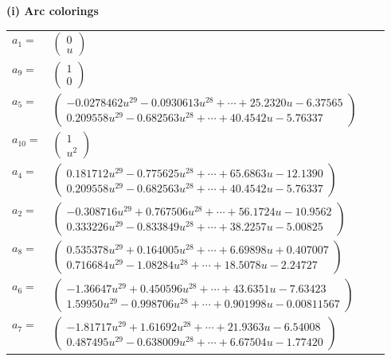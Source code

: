 \documentclass[1p]{elsarticle_modified}
\theoremstyle{definition}
\begin{document}
\flushleft \textbf{(i) Arc colorings}\\
\begin{tabular}{m{7pt} m{180pt} m{7pt} m{180pt} }
\flushright $a_{1}=$&$\begin{pmatrix}0\\u\end{pmatrix}$ \\
\flushright $a_{9}=$&$\begin{pmatrix}1\\0\end{pmatrix}$ \\
\flushright $a_{5}=$&$\begin{pmatrix}-0.0278462 u^{29}-0.0930613 u^{28}+\cdots+25.2320 u-6.37565\\0.209558 u^{29}-0.682563 u^{28}+\cdots+40.4542 u-5.76337\end{pmatrix}$ \\
\flushright $a_{10}=$&$\begin{pmatrix}1\\u^2\end{pmatrix}$ \\
\flushright $a_{4}=$&$\begin{pmatrix}0.181712 u^{29}-0.775625 u^{28}+\cdots+65.6863 u-12.1390\\0.209558 u^{29}-0.682563 u^{28}+\cdots+40.4542 u-5.76337\end{pmatrix}$ \\
\flushright $a_{2}=$&$\begin{pmatrix}-0.308716 u^{29}+0.767506 u^{28}+\cdots+56.1724 u-10.9562\\0.333226 u^{29}-0.833849 u^{28}+\cdots+38.2257 u-5.00825\end{pmatrix}$ \\
\flushright $a_{8}=$&$\begin{pmatrix}0.535378 u^{29}+0.164005 u^{28}+\cdots+6.69898 u+0.407007\\0.716684 u^{29}-1.08284 u^{28}+\cdots+18.5078 u-2.24727\end{pmatrix}$ \\
\flushright $a_{6}=$&$\begin{pmatrix}-1.36647 u^{29}+0.450596 u^{28}+\cdots+43.6351 u-7.63423\\1.59950 u^{29}-0.998706 u^{28}+\cdots+0.901998 u-0.00811567\end{pmatrix}$ \\
\flushright $a_{7}=$&$\begin{pmatrix}-1.81717 u^{29}+1.61692 u^{28}+\cdots+21.9363 u-6.54008\\0.487495 u^{29}-0.638009 u^{28}+\cdots+6.67504 u-1.77420\end{pmatrix}$ \\

\end{tabular}
\end{document}
